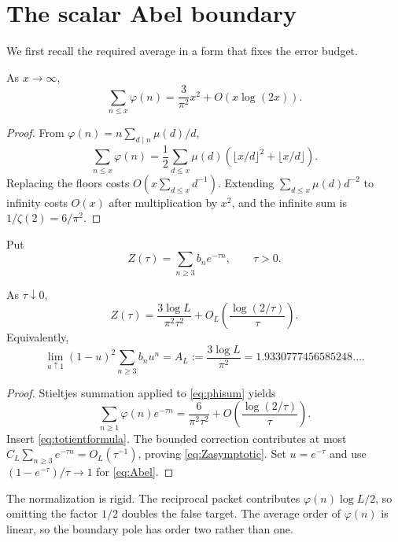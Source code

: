 \section{The scalar Abel boundary}

We first recall the required average in a form that fixes the error budget.

\begin{lemma}
As $x\to\infty$,
\begin{equation}
\sum_{n\le x}\varphi(n)
=\frac{3}{\pi^2}x^2+O(x\log(2x)).
\label{eq:phisum}
\end{equation}
\end{lemma}

\begin{proof}
From $\varphi(n)=n\sum_{d\mid n}\mu(d)/d$,
\[
\sum_{n\le x}\varphi(n)
=\frac12\sum_{d\le x}\mu(d)
\left(\lfloor x/d\rfloor^2+\lfloor x/d\rfloor\right).
\]
Replacing the floors costs $O(x\sum_{d\le x}d^{-1})$.  Extending
$\sum_{d\le x}\mu(d)d^{-2}$ to infinity costs $O(x)$ after multiplication
by $x^2$, and the infinite sum is $1/\zeta(2)=6/\pi^2$.
\end{proof}

Put
\begin{equation}
Z(\tau)=\sum_{n\ge3}b_ne^{-\tau n},\qquad \tau>0.
\label{eq:Ztau}
\end{equation}

\begin{theorem}
As $\tau\downarrow0$,
\begin{equation}
Z(\tau)=\frac{3\log L}{\pi^2\tau^2}
+O_L\!\left(\frac{\log(2/\tau)}{\tau}\right).
\label{eq:Zasymptotic}
\end{equation}
Equivalently,
\begin{equation}
\lim_{u\uparrow1}(1-u)^2\sum_{n\ge3}b_nu^n
=A_L:=\frac{3\log L}{\pi^2}
=1.9330777456585248\ldots .
\label{eq:Abel}
\end{equation}
\end{theorem}

\begin{proof}
Stieltjes summation applied to \eqref{eq:phisum} yields
\[
\sum_{n\ge1}\varphi(n)e^{-\tau n}
=\frac{6}{\pi^2\tau^2}
+O\!\left(\frac{\log(2/\tau)}{\tau}\right).
\]
Insert \eqref{eq:totientformula}.  The bounded correction contributes at
most $C_L\sum_{n\ge3}e^{-\tau n}=O_L(\tau^{-1})$, proving
\eqref{eq:Zasymptotic}.  Set $u=e^{-\tau}$ and use
$(1-e^{-\tau})/\tau\to1$ for \eqref{eq:Abel}.
\end{proof}

The normalization is rigid.  The reciprocal packet contributes
$\varphi(n)\log L/2$, so omitting the factor $1/2$ doubles the false target.
The average order of $\varphi(n)$ is linear, so the boundary pole has order
two rather than one.
